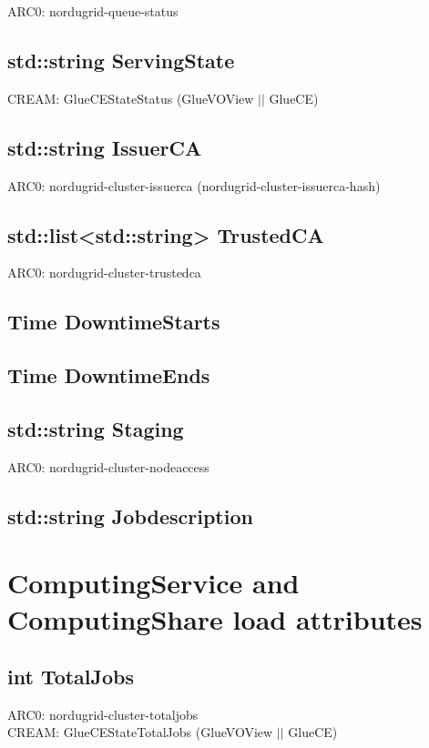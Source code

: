 \documentclass{book}
\begin{document}
ARC0: nordugrid-queue-status

\subsection*{std::string ServingState}

CREAM: GlueCEStateStatus (GlueVOView $||$ GlueCE)

\subsection*{std::string IssuerCA}

ARC0: nordugrid-cluster-issuerca (nordugrid-cluster-issuerca-hash)

\subsection*{std::list<std::string> TrustedCA}

ARC0: nordugrid-cluster-trustedca

\subsection*{Time DowntimeStarts}

\subsection*{Time DowntimeEnds}

\subsection*{std::string Staging}

ARC0: nordugrid-cluster-nodeaccess

\subsection*{std::string Jobdescription}

\section{ComputingService and ComputingShare load attributes}

\subsection*{int TotalJobs}

ARC0: nordugrid-cluster-totaljobs \\
CREAM: GlueCEStateTotalJobs (GlueVOView $||$ GlueCE)
\end{document}
